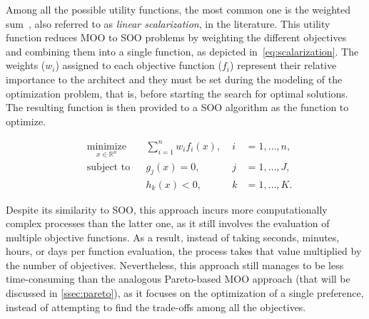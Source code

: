 	Among all the possible utility functions, the most common one is the weighted sum~\cite{Wortmann2017Opossum}, also referred to as \textit{linear scalarization}, in the literature. This utility function reduces \ac{MOO} to \ac{SOO} problems by weighting the different objectives and combining them into a single function, as depicted in~\cref{eq:scalarization}. The weights ($w_i$) assigned to each objective function ($f_i$) represent their relative importance to the architect and they must be set during the modeling of the optimization problem, that is, before starting the search for optimal solutions. The resulting function is then provided to a \ac{SOO} algorithm as the function to optimize. 
	
	\begin{equation} \label{eq:scalarization}
	\begin{aligned}
	& \underset{x \in \mathbb{R}^n}{\text{minimize}}
	& & \sum_{i=1}^n w_i f_i(x), & \; i &= 1, \ldots, n, \\
	& \text{subject to}
	& & g_j(x) = 0, & \; j &= 1, \ldots, J, \\ 
	&&& h_k(x) < 0, & \; k &= 1, \ldots, K.
	\end{aligned}
	\end{equation}
	
	Despite its similarity to \ac{SOO}, this approach incurs more computationally complex processes than the latter one, as it still involves the evaluation of multiple objective functions. As a result, instead of taking seconds, minutes, hours, or days per function evaluation, the process takes that value multiplied by the number of objectives. Nevertheless, this approach still manages to be less time-consuming than the analogous Pareto-based \ac{MOO} approach (that will be discussed in \cref{ssec:pareto}), as it focuses on the optimization of a single preference, instead of attempting to find the trade-offs among all the objectives. 
	
